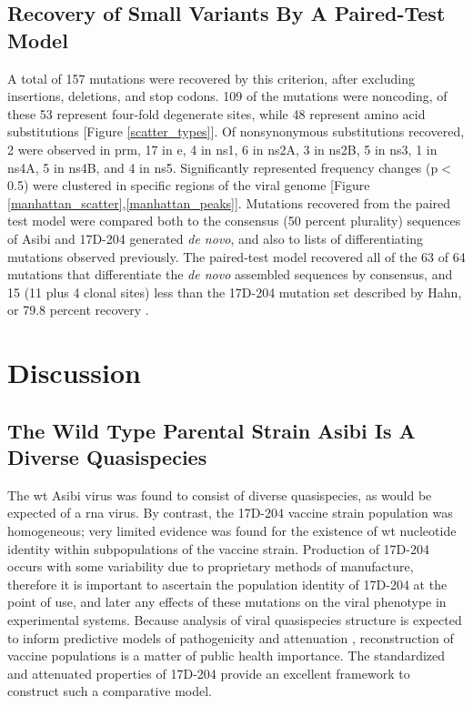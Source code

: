 \subsection{Recovery of Small Variants By A Paired-Test Model}
A total of 157 mutations were recovered by this criterion, after excluding insertions, deletions, and stop codons. 109 of the mutations were noncoding, of these 53 represent four-fold degenerate sites, while 48 represent amino acid substitutions [Figure \ref{scatter_types}]. Of nonsynonymous substitutions recovered, 2 were observed in \gls{prm}, 17 in \gls{e}, 4 in \gls{ns}1, 6 in \gls{ns}2A, 3 in \gls{ns}2B, 5 in \gls{ns}3, 1 in \gls{ns}4A, 5 in \gls{ns}4B, and 4 in \gls{ns}5. Significantly represented frequency changes (p$<$0.5) were clustered in specific regions of the viral genome [Figure \ref{manhattan_scatter},\ref{manhattan_peaks}]. Mutations recovered from the paired test model were compared both to the consensus (50 percent plurality) sequences of Asibi and 17D-204 generated \emph{de novo}, and also to lists of differentiating mutations observed previously. The paired-test model recovered all of the 63 of 64 mutations that differentiate the \emph{de novo} assembled sequences by consensus, and 15 (11 plus 4 clonal sites) less than the 17D-204 mutation set described by Hahn, or 79.8 percent recovery \parencite{Hahn:1987tw}.

\section{Discussion}
\subsection{The Wild Type Parental Strain Asibi Is A Diverse Quasispecies}
The \gls{wt} Asibi virus was found to consist of diverse quasispecies, as would be expected of a \gls{rna} virus. By contrast, the 17D-204 vaccine strain population was homogeneous; very limited evidence was found for the existence of \gls{wt} nucleotide identity within subpopulations of the vaccine strain. Production of 17D-204 occurs with some variability due to proprietary methods of manufacture, therefore it is important to ascertain the population identity of 17D-204 at the point of use, and later any effects of these mutations on the viral phenotype in experimental systems. Because analysis of viral quasispecies structure is expected to inform predictive models of pathogenicity and attenuation \parencite{Luciani:2012em}, reconstruction of vaccine populations is a matter of public health importance. The standardized and attenuated properties of 17D-204 provide an excellent framework to construct such a comparative model.

